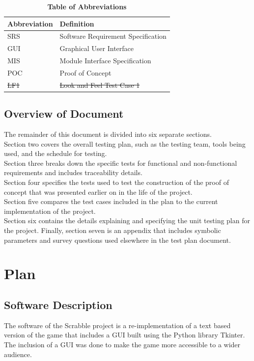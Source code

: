 \documentclass[12pt, titlepage]{article}
\begin{document}
\begin{table}[hbp]
\caption{\textbf{Table of Abbreviations}} \label{Table}

\begin{tabularx}{\textwidth}{p{3cm}X}
\toprule
\textbf{Abbreviation} & \textbf{Definition} \\
\midrule
SRS & Software Requirement Specification\\
GUI & Graphical User Interface\\
MIS & Module Interface Specification\\
POC & Proof of Concept \\
\sout{LF1} & \sout{Look and Feel Test Case 1}
\bottomrule
\end{tabularx}

\end{table}

\subsection{Overview of Document}
The remainder of this document is divided into six separate sections. \\
Section two covers the overall testing plan, such as the testing team, tools being used, and the schedule for testing.\\ 
Section three breaks down the specific tests for functional and non-functional requirements and includes traceability details.\\
Section four specifies the tests used to test the construction of the proof of concept that was presented earlier on in the life of the project.\\
Section five compares the test cases included in the plan to the current implementation of the project.\\
Section six contains the details explaining and specifying the unit testing plan for the project.
Finally, section seven is an appendix that includes symbolic parameters and survey questions used elsewhere in the test plan document.

\section{Plan} 
	
\subsection{Software Description}
The software of the Scrabble project is a re-implementation of a text based version of the game that includes a GUI built using the Python library Tkinter. The inclusion of a GUI was done to make the game more accessible to a wider audience.
\end{document}
